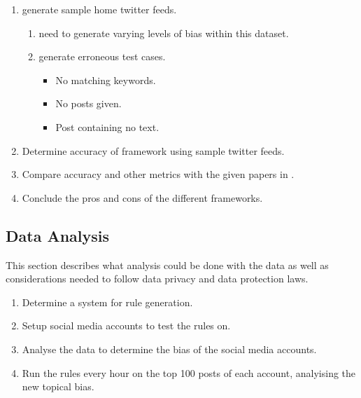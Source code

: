 \documentclass[a4paper,fleqn,10pt]{article}
\begin{document}
\begin{enumerate}
    \item generate sample home twitter feeds.
    \begin{enumerate}
        \item need to generate varying levels of bias within this dataset.
        \item generate erroneous test cases.
        \begin{itemize}
            \item No matching keywords.
            \item No posts given.
            \item Post containing no text.
        \end{itemize}
    \end{enumerate}
    \item Determine accuracy of framework using sample twitter feeds.
    \item Compare accuracy and other metrics with the given papers in .
    \item Conclude the pros and cons of the different frameworks.
\end{enumerate}
\subsection{Data Analysis}
\label{subsec:analysis}
This section describes what analysis could be done with the data as well as considerations needed to
follow data privacy and data protection laws.
\begin{enumerate}
    \item Determine a system for rule generation.
    \item Setup social media accounts to test the rules on.
    \item Analyse the data to determine the bias of the social media accounts.
    \item Run the rules every hour on the top 100 posts of each account, analyising the new topical bias.
\end{enumerate}
\end{document}
